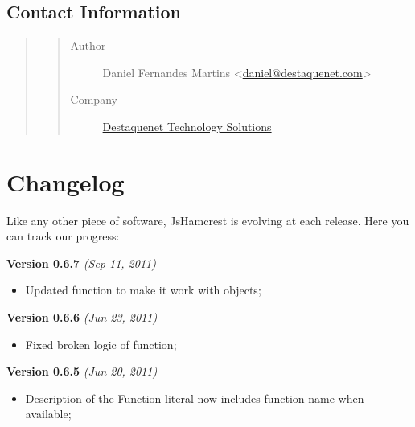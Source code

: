 \documentclass[letterpaper,10pt,english]{sphinxmanual}
\begin{document}
\subsection{Contact Information}
\label{getting_involved:contact-information}\begin{quote}
\begin{quote}\begin{description}
\item[{Author}] \leavevmode
Daniel Fernandes Martins \textless{}\href{mailto:daniel@destaquenet.com}{daniel@destaquenet.com}\textgreater{}

\item[{Company}] \leavevmode
\href{http://www.destaquenet.com/}{Destaquenet Technology Solutions}

\end{description}\end{quote}
\end{quote}


\section{Changelog}
\label{changelog:destaquenet-technology-solutions}\label{changelog::doc}\label{changelog:changelog}
Like any other piece of software, JsHamcrest is evolving at each release.
Here you can track our progress:

\textbf{Version 0.6.7} \emph{(Sep 11, 2011)}
\begin{itemize}
\item {} 
Updated {\hyperref[modules/matchers:JsHamcrest.Matchers.hasSize]{}} function to make it work with
objects;

\end{itemize}

\textbf{Version 0.6.6} \emph{(Jun 23, 2011)}
\begin{itemize}
\item {} 
Fixed broken logic of {\hyperref[modules/jshamcrest:JsHamcrest.areArraysEqual]{}} function;

\end{itemize}

\textbf{Version 0.6.5} \emph{(Jun 20, 2011)}
\begin{itemize}
\item {} 
Description of the Function literal now includes function name when
available;

\end{itemize}
\end{document}
